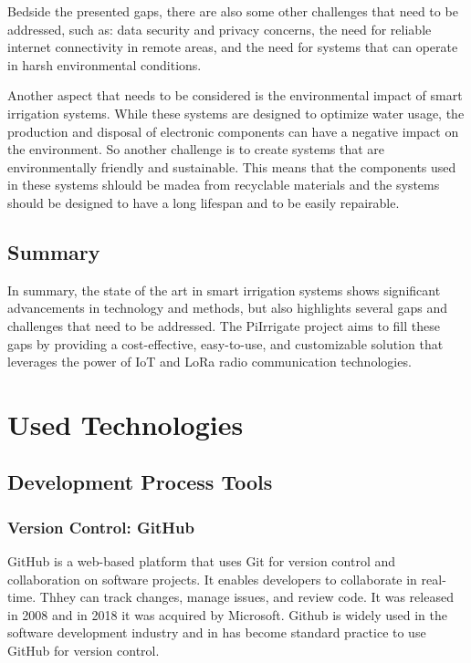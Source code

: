 Bedside the presented gaps, there are also some other challenges that need to be addressed, such as:
data security and privacy concerns, the need for reliable internet connectivity in remote areas, 
and the need for systems that can operate in harsh environmental conditions. 

Another aspect that needs to be considered is the environmental impact of smart irrigation systems.
While these systems are designed to optimize water usage,
the production and disposal of electronic components can have a negative impact on the environment.
So another challenge is to create systems that are environmentally friendly and sustainable. This means 
that the components used in these systems shlould be madea from recyclable materials 
and the systems should be designed to have a long lifespan and to be easily repairable.

\section{Summary}
In summary, the state of the art in smart irrigation systems shows significant 
advancements in technology and methods, but also highlights several gaps and challenges 
that need to be addressed. The PiIrrigate project aims to fill these gaps by providing a
cost-effective, easy-to-use, and customizable solution that leverages the power of IoT and LoRa 
radio communication technologies. 

\chapter{Used Technologies}
\section{Development Process Tools}
\subsection{Version Control: GitHub}
GitHub is a web-based platform that uses Git for version control and collaboration on software projects.
It enables developers to collaborate in real-time. Thhey can track changes, manage issues, and review code.
It was released in 2008 and in 2018 it was acquired by Microsoft\cite{githubDefinition}.
Github is widely used in the software development industry and in has become standard practice to 
use GitHub for version control. 

